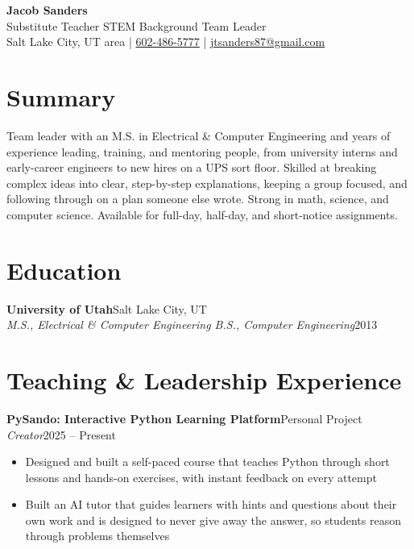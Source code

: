 \documentclass[10.5pt, letterpaper]{article}
\newcommand{\jobentry}[4]{%
  \noindent
  \textbf{\color{accent}#1}\hfill\textcolor{muted}{\small #2}\\
  \textit{#3}\hfill\textcolor{muted}{\small #4}%
}
\begin{document}
\begin{center}
  {\fontsize{28}{32}\selectfont\bfseries\color{accent} Jacob Sanders}\\[5pt]
  {\large\color{muted} Substitute Teacher \enspace\textbullet\enspace STEM Background \enspace\textbullet\enspace Team Leader}\\[8pt]
  \small
  \faMapMarker*\enspace Salt Lake City, UT area
  \enspace\textcolor{accent}{|}\enspace
  \faPhone\enspace \href{tel:6024865777}{602-486-5777}
  \enspace\textcolor{accent}{|}\enspace
  \faEnvelope\enspace \href{mailto:jtsanders87@gmail.com}{jtsanders87@gmail.com}
\end{center}

\vspace{2pt}

\section{Summary}

Team leader with an M.S. in Electrical \& Computer Engineering and years of
experience leading, training, and mentoring people, from university interns and
early-career engineers to new hires on a UPS sort floor. Skilled at breaking
complex ideas into clear, step-by-step explanations, keeping a group focused, and
following through on a plan someone else wrote. Strong in math, science, and
computer science. Available for full-day, half-day, and short-notice assignments.

\section{Education}

\jobentry{University of Utah}{Salt Lake City, UT}%
  {M.S., Electrical \& Computer Engineering \enspace\textbullet\enspace B.S., Computer Engineering}{2013}

\section{Teaching \& Leadership Experience}

\jobentry{PySando: Interactive Python Learning Platform}{Personal Project}{Creator}{2025 -- Present}
\begin{itemize}
  \item Designed and built a self-paced course that teaches Python through short
        lessons and hands-on exercises, with instant feedback on every attempt
  \item Built an AI tutor that guides learners with hints and questions about their
        own work and is designed to never give away the answer, so students reason
        through problems themselves
\end{itemize}
\end{document}
